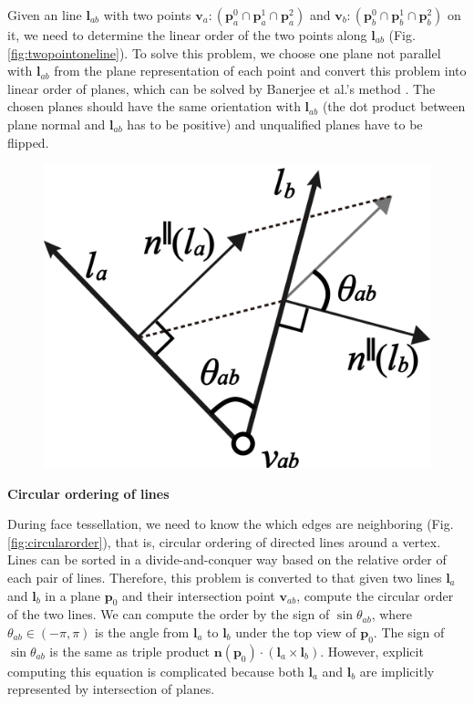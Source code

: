 \documentclass[10pt,journal,compsoc]{IEEEtran}
\begin{document}
\noindent Given an line $\bm{l}_{ab}$ with two points $\bm{v}_a\colon(\bm{p}_a^0\cap\bm{p}_a^1\cap\bm{p}_a^2)$ and $\bm{v}_b\colon(\bm{p}_b^0\cap\bm{p}_b^1\cap\bm{p}_b^2)$ on it, we need to determine the linear order of the two points along $\bm{l}_{ab}$ (Fig. \ref{fig:twopointoneline}). To solve this problem, we choose one plane not parallel with $\bm{l}_{ab}$ from the plane representation of each point and convert this problem into linear order of planes, which can be solved by Banerjee et al.'s method \cite{banerjee1996topologically}. The chosen planes should have the same orientation with $\bm{l}_{ab}$ (the dot product between plane normal and $\bm{l}_{ab}$ has to be positive) and unqualified planes have to be flipped.


\begin{figure}
\includegraphics[width=1.5 in]{boolean-02}
\end{figure}
\vspace{0.5em}
\noindent \textbf{Circular ordering of lines}~~~~

\noindent During face tessellation, we need to know the which edges are neighboring (Fig. \ref{fig:circularorder}), that is, circular ordering of directed lines around a vertex. Lines can be sorted in a divide-and-conquer way based on the relative order of each pair of lines. Therefore, this problem is converted to that given two lines $\bm{l}_a$ and $\bm{l}_b$ in a plane $\bm{p}_0$ and their intersection point $\bm{v}_{ab}$, compute the circular order of the two lines. We can compute the order by the sign of $\sin{\theta_{ab}}$, where $\theta_{ab}\in(-\pi,\pi)$ is the angle from $\bm{l}_a$ to $\bm{l}_b$ under the top view of $\bm{p}_0$. The sign of $\sin{\theta_{ab}}$ is the same as triple product $\bm{n}(\bm{p}_0) \cdot (\bm{l}_a\times\bm{l}_b)$. However, explicit computing this equation is complicated because both $\bm{l}_a$ and $\bm{l}_b$ are implicitly represented by intersection of planes.
\end{document}
